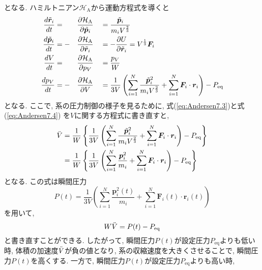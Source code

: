 となる. ハミルトニアン$\mathcal{H}_{\mathrm{A}}$から運動方程式を導くと
\begin{alignat}{3}
 \frac{d \Tilde{\bm{r}}_{i}}{d t}
  &= &&\frac{\partial \mathcal{H}_{\mathrm{A}}}{\partial \Tilde{\bm{p}}_{i}} &
  &= \frac{\Tilde{\bm{p}}_{i}}{m_{i} V^{\frac{2}{3}}}
 \label{eq:Andersen7.1}
 \\
 \frac{d \Tilde{\bm{p}}_{i}}{d t}
  &= - &&\frac{\partial \mathcal{H}_{\mathrm{A}}}{\partial \Tilde{\bm{r}}_{i}}&
  &= - \frac{\partial U}{\partial \Tilde{\bm{r}}_{i}}
   =   V^{\frac{1}{3}} \bm{F}_{i}
 \label{eq:Andersen7.2}
 \\
 \frac{d V}{d t}
  &= &&\frac{\partial \mathcal{H}_{\mathrm{A}}}{\partial p_{V}} &
 &= \frac{p_{V}}{W}
 \label{eq:Andersen7.3}
 \\
 \frac{d p_{V}}{d t}
  &= - &&\frac{\partial \mathcal{H}_{\mathrm{A}}}{\partial V}  &
  &= \frac{1}{3V}
   \left(
         \sum_{i=1}^{N} \frac{\Tilde{\bm{p}}^{2}_{i}}{m_{i} V^{\frac{2}{3}}}
       + \sum_{i=1}^{N} \bm{F}_{i} \cdot \bm{r}_{i}
   \right)
   - P_{\mathrm{eq}}
 \label{eq:Andersen7.4}
\end{alignat}
となる. 
ここで, 系の圧力制御の様子を見るために, 式(\ref{eq:Andersen7.3})と式(\ref{eq:Andersen7.4})
を$V$に関する方程式に書き直すと, 
\begin{align}
 \Ddot{V}
 &=
 \frac{1}{W}
 \left\{
 \frac{1}{3V}
 \left(
 \sum_{i=1}^{N} \frac{\Tilde{\bm{p}}_{i}^{2}}{m_{i} V^{\frac{2}{3}}}
 + \sum_{i=1}^{N} \bm{F}_{i} \cdot \bm{r}_{i}
 \right)
 - P_{\mathrm{eq}}
 \right\}
 \notag
 \\
 &=
 \frac{1}{W}
 \left\{
 \frac{1}{3V}
 \left(
 \sum_{i=1}^{N} \frac{\bm{p}_{i}^{2}}{m_{i}}
 + \sum_{i=1}^{N} \bm{F}_{i} \cdot \bm{r}_{i}
  \right)
 - P_{\mathrm{eq}}
 \right\}
 \label{eq:Andersen8}
\end{align}
となる. この式は瞬間圧力
\begin{equation}
 P(t)
  = \frac{1}{3V}
  \left(
   \sum_{i=1}^{N} \frac{\bm{p}_{i}^{2} (t)}{m_{i}}
  +\sum_{i=1}^{N} \bm{F}_{i}(t) \cdot \bm{r}_{i}(t)
   \right)
 \label{eq:Andersen9}
\end{equation}
を用いて, 
\begin{equation}
 W \Ddot{V} = P(t) - P_{\mathrm{eq}}
\label{eq:Andersen10}
\end{equation}
と書き直すことができる. 
したがって, 瞬間圧力$P(t)$が設定圧力$P_{\mathrm{eq}}$よりも低い時, 
体積の加速度$\Ddot{V}$が負の値となり, 系の収縮速度を大きくさせることで, 瞬間圧力$P(t)$を高くする. 
一方で, 瞬間圧力$P(t)$が設定圧力$P_{\mathrm{eq}}$よりも高い時, 
